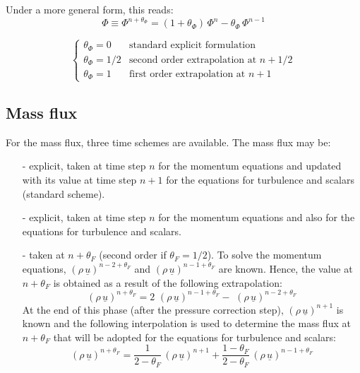 Under a more general form, this reads:
\begin{equation}
\Phi \equiv \Phi^{n+\theta_{\Phi}}=(1+\theta_{\Phi})\,\Phi^{n}-
\theta_{\Phi}\,\Phi^{n-1}
\end{equation}

\begin{equation}
\left\{%
\begin{array}{ll}
\theta_{\Phi} = 0 & \text{standard explicit formulation} \\
\theta_{\Phi} = 1/2 & \text{second order extrapolation at } n+1/2 \\
\theta_{\Phi} = 1 & \text{first order extrapolation at } n+1%
\end{array}
\right.
\end{equation}

\subsection{Mass flux}

For the mass flux, three time schemes are available. The mass flux may be:

\begin{itemize}
\item[-] explicit, taken at time step $n$ for the momentum equations and
updated with its value at time step $n+1$ for the equations for turbulence
and scalars (standard scheme).\newline

\item[-] explicit, taken at time step $n$ for the momentum equations and
also for the equations for turbulence and scalars.

\item[-] taken at $n+\theta_{F}$ (second order if $\theta_{F}=1/2$). To
solve the momentum equations, $(\rho\,\underline{u})^{n-2+\theta_{F}}$ and $%
(\rho\,\underline{u})^{n-1+\theta_{F}}$ are known. Hence, the value at $%
n+\theta_{F}$ is obtained as a result of the following extrapolation:
\begin{equation}
(\rho\,\underline{u})^{n+\theta_{F}}= 2\,\,(\rho\,\underline{u}%
)^{n-1+\theta_{F}} -\,\,(\rho\,\underline{u})^{n-2+\theta_{F}}
\end{equation}
At the end of this phase (after the pressure correction step), $(\rho\,%
\underline{u})^{n+1}$ is known and the following interpolation is used to
determine the mass flux at $n+\theta_{F}$ that will be adopted for the
equations for turbulence and scalars:
\begin{equation}
(\rho\,\underline{u})^{n+\theta_{F}}= \frac{1}{2-\theta_{F}}\,(\rho\,%
\underline{u})^{n+1} +\frac{1-\theta_{F}}{2-\theta_{F}}\,(\rho\,\underline{u}%
)^{n-1+\theta_{F}}
\end{equation}
\end{itemize}

